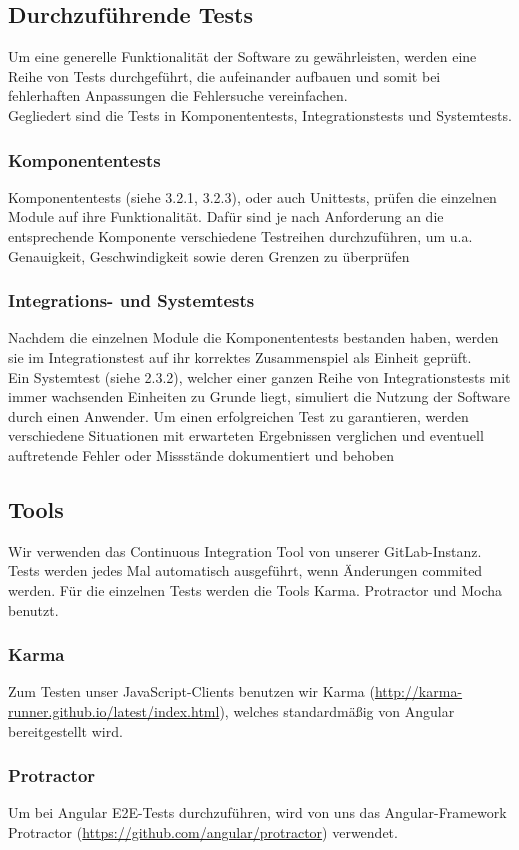 \documentclass[11pt,a4paper]{report}
\begin{document}
\subsection{Durchzuführende Tests}
Um eine generelle Funktionalität der Software zu gewährleisten, werden eine Reihe von Tests durchgeführt, die aufeinander aufbauen und somit bei fehlerhaften Anpassungen die Fehlersuche vereinfachen.\\
Gegliedert sind die Tests in Komponententests, Integrationstests und Systemtests. 
\subsubsection{Komponententests}
Komponententests (siehe 3.2.1, 3.2.3), oder auch Unittests, prüfen die einzelnen Module auf ihre Funktionalität. Dafür
sind je nach Anforderung an die entsprechende Komponente verschiedene Testreihen
durchzuführen, um u.a. Genauigkeit, Geschwindigkeit sowie deren Grenzen zu überprüfen
\subsubsection{Integrations- und Systemtests}
Nachdem die einzelnen Module die Komponententests bestanden haben, werden sie im Integrationstest auf ihr korrektes Zusammenspiel als Einheit geprüft.\\
Ein Systemtest (siehe 2.3.2), welcher einer ganzen Reihe von Integrationstests mit immer wachsenden Einheiten zu
Grunde liegt, simuliert die Nutzung der Software durch einen Anwender. Um einen erfolgreichen Test zu garantieren, werden verschiedene Situationen mit erwarteten
Ergebnissen verglichen und eventuell auftretende Fehler oder Missstände dokumentiert und behoben
\subsection{Tools}
Wir verwenden das Continuous Integration Tool von unserer GitLab-Instanz. Tests werden jedes Mal automatisch ausgeführt, wenn Änderungen commited werden. Für die einzelnen Tests werden die Tools Karma. Protractor und Mocha benutzt.
\subsubsection{Karma}
Zum Testen unser JavaScript-Clients benutzen wir Karma (\url{http://karma-runner.github.io/latest/index.html}), welches standardmäßig von Angular bereitgestellt wird.
\subsubsection{Protractor}
Um bei Angular E2E-Tests durchzuführen, wird von uns das Angular-Framework Protractor (\url{https://github.com/angular/protractor}) verwendet.
\end{document}
